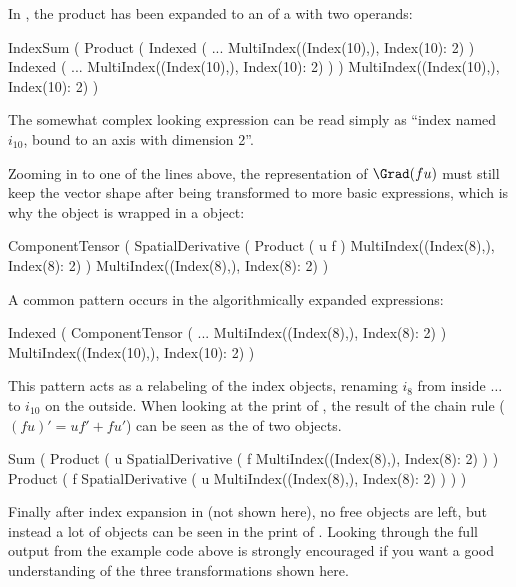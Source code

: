 In , the  product has been expanded to an
 of a  with two  operands:
\begin{python}
IndexSum
(
    Product
    (
        Indexed
        (
            ...
            MultiIndex((Index(10),), {Index(10): 2})
        )
        Indexed
        (
            ...
            MultiIndex((Index(10),), {Index(10): 2})
        )
    )
    MultiIndex((Index(10),), {Index(10): 2})
)
\end{python}
The somewhat complex looking expression 
can be read simply as ``index named $i_{10}$, bound to an axis with dimension 2''.

Zooming in to one of the  lines above, the representation
of $\Grad(fu)$ must still keep the vector shape after being
transformed to more basic expressions, which is why the
 object is wrapped in a
 object:
\begin{python}
ComponentTensor
(
    SpatialDerivative
    (
        Product     
        (
            u
            f
        )
        MultiIndex((Index(8),), {Index(8): 2})
    )
    MultiIndex((Index(8),), {Index(8): 2})
)
\end{python}
A common pattern occurs in the algorithmically expanded expressions:
\begin{python}
Indexed
(
    ComponentTensor
    (
        ...
        MultiIndex((Index(8),), {Index(8): 2})
    )
    MultiIndex((Index(10),), {Index(10): 2})
)
\end{python}
This pattern acts as a relabeling of the index objects, renaming
$i_{8}$ from inside $\ldots$ to $i_{10}$ on the outside.  When looking
at the print of , the result of the chain rule
($(fu)' = u f' + f u'$) can be seen as the  of two
 objects.
\begin{python}
Sum
(
    Product
    (
        u
        SpatialDerivative
        (
            f
            MultiIndex((Index(8),), {Index(8): 2})
        )
    )
    Product
    (
        f
        SpatialDerivative
        (
            u
            MultiIndex((Index(8),), {Index(8): 2})
        )
    )
)
\end{python}
Finally after index expansion in  (not shown here), no free
 objects are left, but instead a lot of 
objects can be seen in the print of . Looking through the
full output from the example code above is strongly encouraged if you
want a good understanding of the three transformations shown here.


